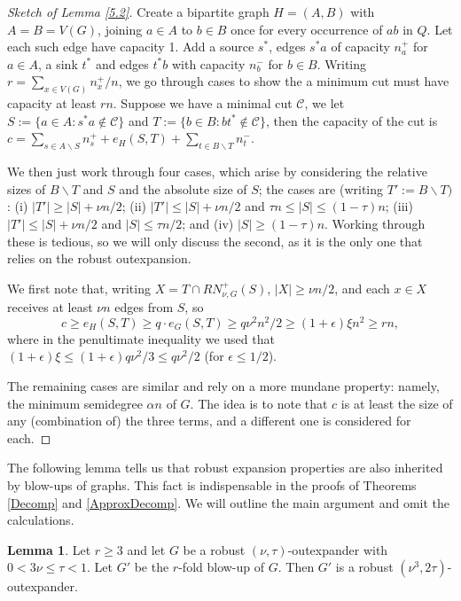\documentclass[10pt,letterpaper, reqno]{amsart}
\theoremstyle{definition}
\newtheorem{lemma}[thm]{Lemma}
\numberwithin{equation}{section}
\begin{document}
\begin{proof}[Sketch of Lemma \ref{5.2}]
	 Create a bipartite graph $H=(A,B)$ with $A=B=V(G)$, joining $a\in A$ to $b \in B$ once for every occurrence of $ab$ in $Q$. Let each such edge have capacity 1. Add a source $s^*$, edges $s^*a$ of capacity $n_a^+$ for $a \in A$, a sink $t^*$ and edges $t^*b$ with capacity $n_b^-$ for $b \in B$. Writing $r=\sum_{x \in V(G)} n_x^+/n$, we go through cases to show the a minimum cut must have capacity at least $rn$. Suppose we have a minimal cut $\mathcal{C}$, we let $S := \{a \in A  : s^* a \not \in \mathcal{C} \}$ and $T := \{b \in B: bt^* \not \in \mathcal{C} \}$, then the capacity of the cut is $c = \sum_{s \in A \backslash S}n_s^+ + e_H(S,T) + \sum_{t \in B\backslash T} n^-_t$. 
	 
	 We then just work through four cases, which arise by considering the relative sizes of $B\backslash T$ and $S$ and the absolute size of $S$; the cases are (writing $T':=B\backslash T)$: (i) $|T'| \geq |S| + \nu n/2$; (ii) $|T'|\leq |S| + \nu n/2$ and $\tau n \leq |S| \leq (1-\tau)n$; (iii) $|T'|\leq |S| + \nu n/2$ and $|S| \leq \tau n/2$; and (iv) $|S| \geq (1-\tau) n$. Working through these is tedious, so we will only discuss the second, as it is the only one that relies on the robust outexpansion.
	 
	 We first note that, writing $X = T \cap RN_{\nu,G}^+(S)$,  $|X| \geq \nu n/2$, and each $x \in X$ receives at least $\nu n$ edges from $S$, so 
	 \begin{displaymath}
	 	c \geq e_H(S,T) \geq q \cdot e_G(S,T) \geq q \nu ^2 n^2 /2 \geq (1+\epsilon)\xi n^2 \geq rn,
	 \end{displaymath}
	 where in the penultimate inequality we used that $(1+\epsilon)\xi \leq (1+\epsilon)q \nu ^2/3 \leq q\nu^2/2$ (for $\epsilon \leq 1/2$). 
	 
	 The remaining cases are similar and rely on a more mundane property: namely, the minimum semidegree $\alpha n$ of $G$. The idea is to note that $c$ is at least the size of any (combination of) the three terms, and a different one is considered for each. 
\end{proof}

\noindent The following lemma tells us that robust expansion properties are also inherited by blow-ups of graphs. This fact is indispensable in the proofs of Theorems \ref{Decomp} and \ref{ApproxDecomp}. We will outline the main argument and omit the calculations. 

\begin{lemma}\label{5.3}
	Let $r \geq 3$ and let $G$ be a robust $(\nu, \tau)$-outexpander with $0 < 3\nu \leq \tau <1$. Let $G'$ be the $r$-fold blow-up of $G$. Then $G'$ is a robust $(\nu^3,2\tau)$-outexpander. 
\end{lemma}
\end{document}
